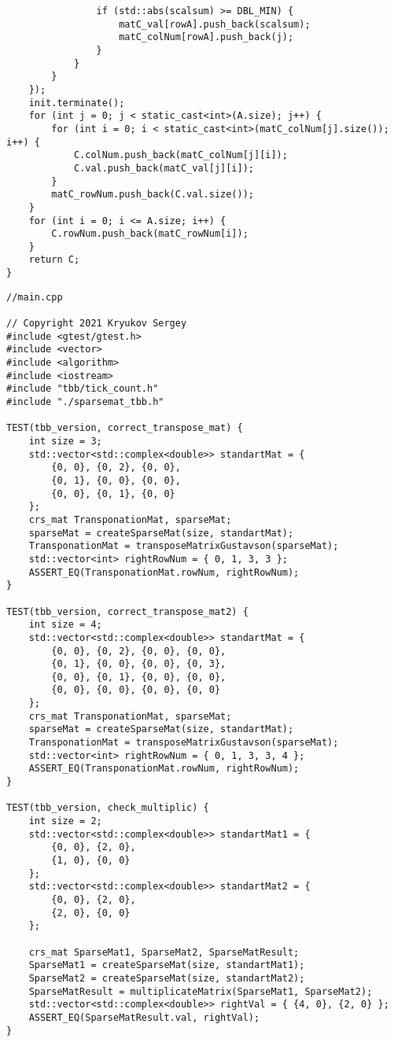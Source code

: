 \documentclass{report}
\begin{document}
\begin{lstlisting}
                if (std::abs(scalsum) >= DBL_MIN) {
                    matC_val[rowA].push_back(scalsum);
                    matC_colNum[rowA].push_back(j);
                }
            }
        }
    });
    init.terminate();
    for (int j = 0; j < static_cast<int>(A.size); j++) {
        for (int i = 0; i < static_cast<int>(matC_colNum[j].size()); i++) {
            C.colNum.push_back(matC_colNum[j][i]);
            C.val.push_back(matC_val[j][i]);
        }
        matC_rowNum.push_back(C.val.size());
    }
    for (int i = 0; i <= A.size; i++) {
        C.rowNum.push_back(matC_rowNum[i]);
    }
    return C;
}
\end{lstlisting}
\begin{lstlisting}
//main.cpp

// Copyright 2021 Kryukov Sergey
#include <gtest/gtest.h>
#include <vector>
#include <algorithm>
#include <iostream>
#include "tbb/tick_count.h"
#include "./sparsemat_tbb.h"

TEST(tbb_version, correct_transpose_mat) {
    int size = 3;
    std::vector<std::complex<double>> standartMat = {
        {0, 0}, {0, 2}, {0, 0},
        {0, 1}, {0, 0}, {0, 0},
        {0, 0}, {0, 1}, {0, 0}
    };
    crs_mat TransponationMat, sparseMat;
    sparseMat = createSparseMat(size, standartMat);
    TransponationMat = transposeMatrixGustavson(sparseMat);
    std::vector<int> rightRowNum = { 0, 1, 3, 3 };
    ASSERT_EQ(TransponationMat.rowNum, rightRowNum);
}

TEST(tbb_version, correct_transpose_mat2) {
    int size = 4;
    std::vector<std::complex<double>> standartMat = {
        {0, 0}, {0, 2}, {0, 0}, {0, 0},
        {0, 1}, {0, 0}, {0, 0}, {0, 3},
        {0, 0}, {0, 1}, {0, 0}, {0, 0},
        {0, 0}, {0, 0}, {0, 0}, {0, 0}
    };
    crs_mat TransponationMat, sparseMat;
    sparseMat = createSparseMat(size, standartMat);
    TransponationMat = transposeMatrixGustavson(sparseMat);
    std::vector<int> rightRowNum = { 0, 1, 3, 3, 4 };
    ASSERT_EQ(TransponationMat.rowNum, rightRowNum);
}

TEST(tbb_version, check_multiplic) {
    int size = 2;
    std::vector<std::complex<double>> standartMat1 = {
        {0, 0}, {2, 0},
        {1, 0}, {0, 0}
    };
    std::vector<std::complex<double>> standartMat2 = {
        {0, 0}, {2, 0},
        {2, 0}, {0, 0}
    };

    crs_mat SparseMat1, SparseMat2, SparseMatResult;
    SparseMat1 = createSparseMat(size, standartMat1);
    SparseMat2 = createSparseMat(size, standartMat2);
    SparseMatResult = multiplicateMatrix(SparseMat1, SparseMat2);
    std::vector<std::complex<double>> rightVal = { {4, 0}, {2, 0} };
    ASSERT_EQ(SparseMatResult.val, rightVal);
}


\end{lstlisting}
\end{document}
